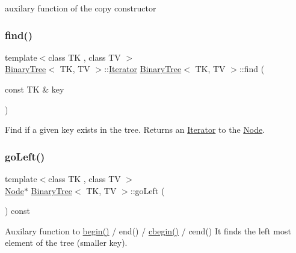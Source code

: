 auxilary function of the copy constructor \mbox{\label{classBinaryTree_ae515b4f35af1e4f44a688cb8698471c8}} 
\subsubsection{\texorpdfstring{find()}{find()}}
{\footnotesize\ttfamily template$<$class TK , class TV $>$ \\
\mbox{\hyperlink{classBinaryTree}{Binary\+Tree}}$<$ TK, TV $>$\+::\mbox{\hyperlink{classBinaryTree_1_1Iterator}{Iterator}} \mbox{\hyperlink{classBinaryTree}{Binary\+Tree}}$<$ TK, TV $>$\+::find (\begin{DoxyParamCaption}\item[{const TK \&}]{key }\end{DoxyParamCaption})}

Find if a given key exists in the tree. Returns an \mbox{\hyperlink{classBinaryTree_1_1Iterator}{Iterator}} to the \mbox{\hyperlink{structBinaryTree_1_1Node}{Node}}. \mbox{\label{classBinaryTree_a5b7168f283acc83b39e5af15b9817b47}} 
\subsubsection{\texorpdfstring{goLeft()}{goLeft()}}
{\footnotesize\ttfamily template$<$class TK , class TV $>$ \\
\mbox{\hyperlink{structBinaryTree_1_1Node}{Node}}$\ast$ \mbox{\hyperlink{classBinaryTree}{Binary\+Tree}}$<$ TK, TV $>$\+::go\+Left (\begin{DoxyParamCaption}{ }\end{DoxyParamCaption}) const\hspace{0.3cm}{\ttfamily [inline]}}

Auxilary function to \mbox{\hyperlink{classBinaryTree_a828acf65e70cf4b6e106807a052ca508}{begin()}} / end() / \mbox{\hyperlink{classBinaryTree_afc1bfd2d748acb391605ffcf8c86439d}{cbegin()}} / cend() It finds the left most element of the tree (smaller key). \mbox{\label{classBinaryTree_a2e953ad45f601f1e94dbdb85c67f0bbb}} 
